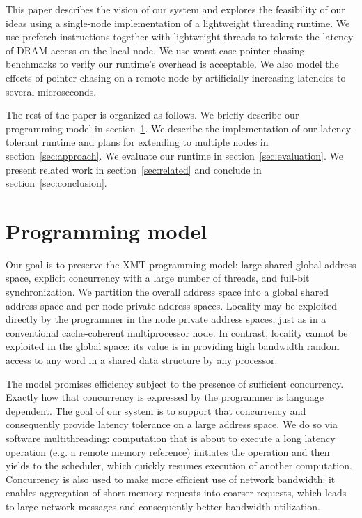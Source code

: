 \documentclass[10pt,nocopyrightspace,preprint]{sigplanconf}
\begin{document}
This paper describes the vision of our system and explores the
feasibility of our ideas using a single-node implementation of a
lightweight threading runtime. We use prefetch instructions together
with lightweight threads to tolerate the latency of DRAM access on the
local node. We use worst-case pointer chasing benchmarks to
verify our runtime's overhead is acceptable. We also model the effects
of pointer chasing on a remote node by artificially increasing
latencies to several microseconds.
 
The rest of the paper is organized as follows. We briefly describe our
programming model in section~\ref{sec:model}. We describe the
implementation of our latency-tolerant runtime and plans for extending
to multiple nodes in section~\ref{sec:approach}. We evaluate our
runtime in section~\ref{sec:evaluation}.  We present related work in
section~\ref{sec:related} and conclude in
section~\ref{sec:conclusion}.


\section{Programming model}
\label{sec:model}

Our goal is to preserve the XMT programming model: large shared global
address space, explicit concurrency with a large number of threads,
and full-bit synchronization.  We partition the overall address
space into a global shared address space and per node private address
spaces. Locality may be exploited directly by the programmer in the
node private address spaces, just as in a conventional cache-coherent
multiprocessor node. In contrast, locality cannot be exploited in the
global space: its value is in providing high bandwidth random access
to any word in a shared data structure by any processor.



The model promises efficiency subject to the presence of sufficient
concurrency.  Exactly how that concurrency is expressed by the
programmer is language dependent. The goal of our system is to support
that concurrency and consequently provide latency tolerance on a large
address space. We do so via software multithreading: computation that
is about to execute a long latency operation (e.g. a remote memory
reference) initiates the operation and then yields to the scheduler,
which quickly resumes execution of another computation. Concurrency is
also used to make more efficient use of network bandwidth: it
enables aggregation of short memory requests into coarser requests,
which leads to large network messages and consequently better
bandwidth utilization.
\end{document}
